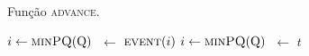 \begin{algorithm}[H]
    \caption[Algoritmo \textsc{advance}]{Função \textsc{advance}.} \label{alg:lista-ordenada:advance}
\begin{algorithmic}[1]
            \State \Return
        \EndIf
        \State $i \leftarrow \Call{minPQ}{$Q$}$
            \State \now $~\leftarrow$ \cert[i]
            \State $\Call{event}{i}$
            \State $i \leftarrow \Call{minPQ}{$Q$}$
        \EndWhile
        \State \now $~\leftarrow$ $t$
    \EndFunction
\end{algorithmic}
\end{algorithm}